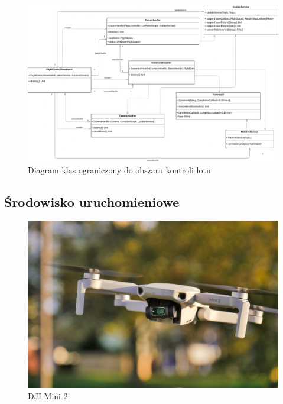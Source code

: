 \begin{figure}[!htp]
\begin{center}
  \includegraphics[width=16cm]{./Obrazy/handlers.png}
  \caption{Diagram klas ograniczony do obszaru kontroli lotu}
\end{center}
\end{figure}

\newpage

\subsection{Środowisko uruchomieniowe}
\begin{figure}[!htp]
\begin{center}
  \includegraphics[width=14cm]{./Obrazy/dji-mini-2.jpg}
  \caption{DJI Mini 2}
  \end{center}
\end{figure}

